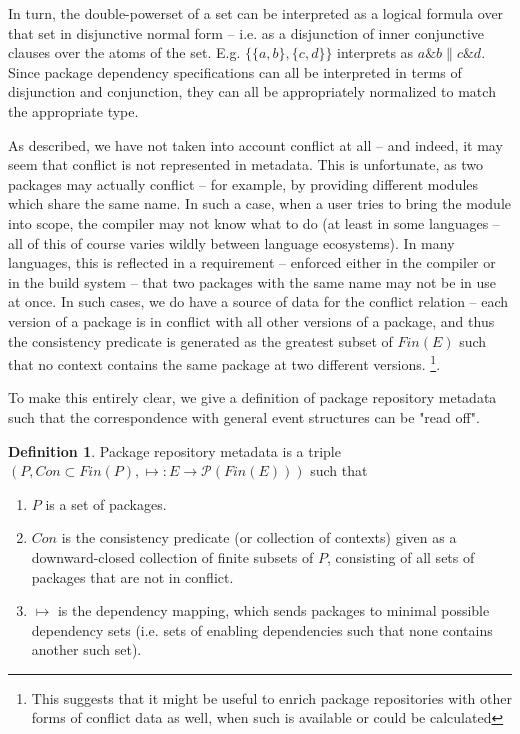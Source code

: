 \documentclass[hoptionsi,review,screen,format=sigconf]{acmart}
\theoremstyle{definition}
\newtheorem{definition}{Definition}[section]
\newcommand{\Pc}{\mathcal{P}}
\newcommand{\band}{\mathop{\&}}
\newcommand{\bor}{\mathop{\|}}
\begin{document}
In turn, the double-powerset of a set can be interpreted as a logical formula over that set in disjunctive normal form -- i.e. as a disjunction of inner conjunctive clauses over the atoms of the set. E.g. \(\{\{a,b\},\{c,d\}\}\) interprets as \(a \band b \bor c \band d\). Since package dependency specifications can all be interpreted in terms of disjunction and conjunction, they can all be appropriately normalized to match the appropriate type.

As described, we have not taken into account conflict at all -- and indeed, it may seem that conflict is not represented in metadata. This is unfortunate, as two packages may actually conflict -- for example, by providing different modules which share the same name. In such a case, when a user tries to bring the module into scope, the compiler may not know what to do (at least in some languages -- all of this of course varies wildly between language ecosystems). In many languages, this is reflected in a requirement -- enforced either in the compiler or in the build system -- that two packages with the same name may not be in use at once. In such cases, we do have a source of data for the conflict relation -- each version of a package is in conflict with all other versions of a package, and thus the consistency predicate is generated as the greatest subset of \(Fin(E)\) such that no context contains the same package at two different versions. \footnote{This suggests that it might be useful to enrich package repositories with other forms of conflict data as well, when such is available or could be calculated}.

To make this entirely clear, we give a definition of package repository metadata such that the correspondence with general event structures can be "read off".

\begin{definition}
Package repository metadata is a triple \((P, Con \subset Fin(P), \mapsto : E \to \Pc(Fin(E)))\) such that

 \renewcommand{\labelenumi}{\roman{enumi}}
  \begin{enumerate}
   \item \(P\) is a set of packages.
   \item \(Con\) is the consistency predicate (or collection of contexts) given as a downward-closed collection of finite subsets of \(P\), consisting of all sets of packages that are not in conflict.
   \item \(\mapsto\) is the dependency mapping, which sends packages to minimal possible dependency sets (i.e. sets of enabling dependencies such that none contains another such set). 
 \end{enumerate}
\end{definition}
\end{document}
